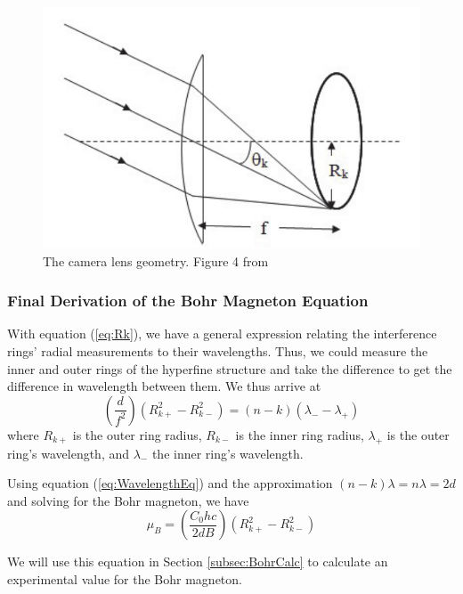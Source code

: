 \documentclass[twocolumn]{article}
\begin{document}
				\begin{figure}
					\centering
					\includegraphics[width=0.95\linewidth]{Images/CameraGeometry}
					\caption{The camera lens geometry. Figure 4 from \cite{brolight_technology_co._ltd._zeeman_????}}
					\label{fig:CameraGeometry}
				\end{figure}

			\subsubsection{Final Derivation of the Bohr Magneton Equation}
				
				With equation (\ref{eq:Rk}), we have a general expression relating the interference rings' radial measurements to their wavelengths.
				Thus, we could measure the inner and outer rings of the hyperfine structure and take the difference to get the difference in wavelength between them.
				We thus arrive at
				\begin{equation}
					\left(\frac{d}{f^2}\right)\left(R_{k+}^2 - R_{k-}^2\right) = (n-k)(\lambda_- - \lambda_+)
				\end{equation}
				where $R_{k+}$ is the outer ring radius, $R_{k-}$ is the inner ring radius, $\lambda_+$ is the outer ring's wavelength, and $\lambda_-$ the inner ring's wavelength.
				
				Using equation (\ref{eq:WavelengthEq}) and the approximation $(n-k)\lambda = n\lambda = 2d$ and solving for the Bohr magneton, we have
				\begin{equation}
					\mu_B = \left( \frac{C_0 hc}{2dB} \right) \left( R_{k+}^2 - R_{k-}^2 \right)
					\label{eq:BohrEquation}
				\end{equation}
				
				We will use this equation in Section \ref{subsec:BohrCalc} to calculate an experimental value for the Bohr magneton.
		
\end{document}
